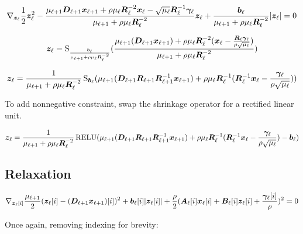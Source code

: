 \documentclass{article}
\begin{document}
\begin{equation}
\nabla_{\bm{z}_{\ell}} \frac{1}{2}\bm{z}_{\ell}^2 - \frac{\mu_{\ell + 1}\bm{D}_{\ell + 1}\bm{x}_{\ell + 1} + \rho\mu_{\ell}\bm{R}_{\ell}^{-2}\bm{x}_{\ell} - \sqrt{\mu_{\ell}}\bm{R}_{\ell}^{-1}\bm{\gamma}_{\ell}}{\mu_{\ell + 1} + \rho\mu_{\ell}\bm{R}_{\ell}^{-2}}\bm{z}_{\ell} + \frac{\bm{b}_{\ell}}{\mu_{\ell + 1} + \rho\mu_{\ell}\bm{R}_{\ell}^{-2}}|\bm{z}_{\ell}| = 0
\end{equation}

\begin{equation}
\bm{z}_{\ell} = \operatorname{S}_{\frac{\bm{b}_{\ell}}{\mu_{\ell + 1} + \rho\mu_{\ell}\bm{R}_{\ell}^{-2}}}(\frac{\mu_{\ell + 1}(\bm{D}_{\ell + 1}\bm{x}_{\ell + 1}) + \rho\mu_{\ell}\bm{R}_{\ell}^{-2}(\bm{x}_{\ell} - \frac{\bm{R}_{\ell}\bm{\gamma}_{\ell}}{\rho\sqrt{\mu_{\ell}}})}{\mu_{\ell + 1} + \rho\mu_{\ell}\bm{R}_{\ell}^{-2}})
\end{equation}

\begin{equation}
\bm{z}_{\ell} = \frac{1}{\mu_{\ell + 1} + \rho\mu_{\ell}\bm{R}_{\ell}^{-2}}\operatorname{S}_{\bm{b}_{\ell}}(\mu_{\ell + 1}(\bm{D}_{\ell + 1}\bm{R}_{\ell + 1}\bm{R}_{\ell + 1}^{-1}\bm{x}_{\ell + 1}) + \rho\mu_{\ell}\bm{R}_{\ell}^{-1}(\bm{R}_{\ell}^{-1}\bm{x}_{\ell} - \frac{\bm{\gamma}_{\ell}}{\rho\sqrt{\mu_{\ell}}}))
\end{equation}

To add nonnegative constraint, swap the shrinkage operator for a rectified linear unit.

\begin{equation}
\bm{z}_{\ell} = \frac{1}{\mu_{\ell + 1} + \rho\mu_{\ell}\bm{R}_{\ell}^{-2}}\operatorname{RELU}(\mu_{\ell + 1}(\bm{D}_{\ell + 1}\bm{R}_{\ell + 1}\bm{R}_{\ell + 1}^{-1}\bm{x}_{\ell + 1}) + \rho\mu_{\ell}\bm{R}_{\ell}^{-1}(\bm{R}_{\ell}^{-1}\bm{x}_{\ell} - \frac{\bm{\gamma}_{\ell}}{\rho\sqrt{\mu_{\ell}}}) - \bm{b}_{\ell})
\end{equation}

\subsection{Relaxation}
\begin{equation}
\nabla_{\bm{z}_{\ell}[i]} \frac{\mu_{\ell + 1}}{2}(\bm{z}_{\ell}[i] - (\bm{D}_{\ell + 1}\bm{x}_{\ell + 1})[i])^2 + \bm{b}_{\ell}[i]|\bm{z}_{\ell}[i]| + \frac{\rho}{2} (\bm{A}_{\ell}[i]\bm{x}_{\ell}[i] + \bm{B}_{\ell}[i]\bm{z}_{\ell}[i] + \frac{\bm{\gamma}_{\ell}[i]}{\rho})^2 = 0
\end{equation}

Once again, removing indexing for brevity:
\end{document}
